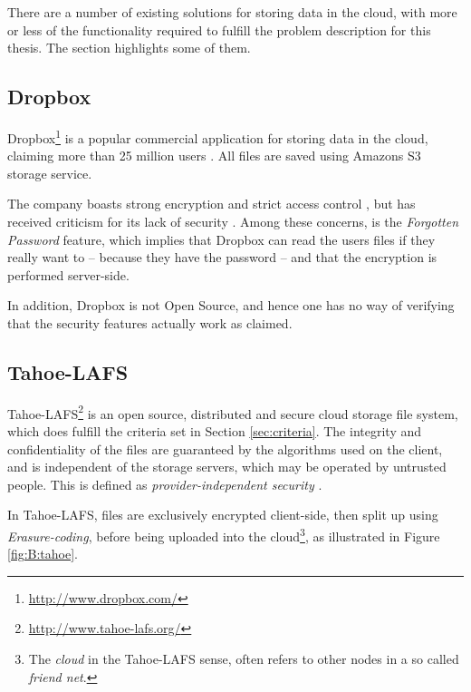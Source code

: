 \documentclass[pdftex,english,10pt,b5paper,twoside]{book}
\begin{document}
There are a number of existing solutions for storing data in the cloud,
with more or less of the functionality required to fulfill the problem
description for this thesis. The section highlights some of them.

\subsection{Dropbox}

Dropbox\footnote{\url{http://www.dropbox.com/}} is a popular commercial
application for storing data in the cloud, claiming more than 25 million users
\cite{dropbox_users}. All files are saved using Amazons S3 storage service.

The company boasts strong encryption and strict access control
\cite{dropbox_security}, but has received criticism for its lack of security
\cite{dropbox_concerns}. Among these concerns, is the \emph{Forgotten Password}
feature, which implies that Dropbox can read the users files if they really
want to -- because they have the password -- and that the encryption is
performed server-side.

In addition, Dropbox is not Open Source, and hence one has no way of verifying
that the security features actually work as claimed.

\subsection{Tahoe-LAFS}
\label{sec:tahoe}

Tahoe-\ac{LAFS}\footnote{\url{http://www.tahoe-lafs.org/}} is an open source,
distributed and secure cloud storage file system, which does fulfill
the criteria set in Section \ref{sec:criteria}.
The integrity and confidentiality of the
files are guaranteed by the algorithms used on the client, and is independent
of the storage servers, which may be operated by untrusted people.
This is defined as \emph{provider-independent security} \cite{tahoe}.

In Tahoe-\ac{LAFS}, files are exclusively encrypted client-side, then split up
using \emph{Erasure-coding}, before being uploaded into the cloud\footnote{The
\emph{cloud} in the Tahoe-\ac{LAFS} sense, often refers to other nodes in a so
called \emph{friend net}.}, as illustrated in Figure \ref{fig:B:tahoe}.
\end{document}

